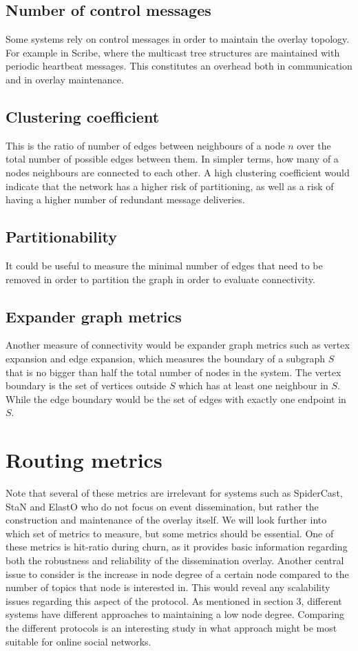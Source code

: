 \subsection{Number of control messages}
Some systems rely on
control messages in order to maintain the overlay topology. For
example in Scribe, where the multicast tree structures are
maintained with periodic heartbeat messages. This constitutes an
overhead both in communication and in overlay maintenance.

\subsection{Clustering coefficient}
This is the ratio of number of edges between neighbours of a node $n$ over
the total number of possible edges between them. In simpler
terms, how
many of a nodes neighbours are connected to each other. A high
clustering coefficient would indicate that the network has a
higher risk of partitioning, as well as a risk of having a
higher number of redundant message deliveries.

\subsection{Partitionability}
It could be useful to measure the minimal number of edges that
need to be removed in order to partition the graph in order to
evaluate connectivity.

\subsection{Expander graph metrics}
Another measure of connectivity would be expander graph metrics
such as vertex expansion and edge expansion, which measures the
boundary of a subgraph $S$ that is no bigger than half the total
number of nodes in the system. The vertex boundary is the set of
vertices outside $S$ which has at least one neighbour in $S$.
While the edge boundary would be the set of edges with exactly
one endpoint in $S$.


\section{Routing metrics}

Note that several of these metrics are irrelevant for systems such
as SpiderCast, StaN and ElastO who do not focus on event dissemination, but
rather the construction and maintenance of the overlay itself.  We
will look further into which set of metrics to measure, but some
metrics should be essential. One of these metrics is hit-ratio
during churn, as it provides basic information regarding both the
robustness and reliability of the dissemination overlay. Another
central issue to consider is the increase in node degree of a
certain node compared to the number of topics that node is
interested in. This would reveal any scalability issues regarding
this aspect of the protocol. As mentioned in section 3, different
systems have different approaches to maintaining a low node degree.
Comparing the different protocols is an interesting study in what approach
might be most suitable for online social networks.



